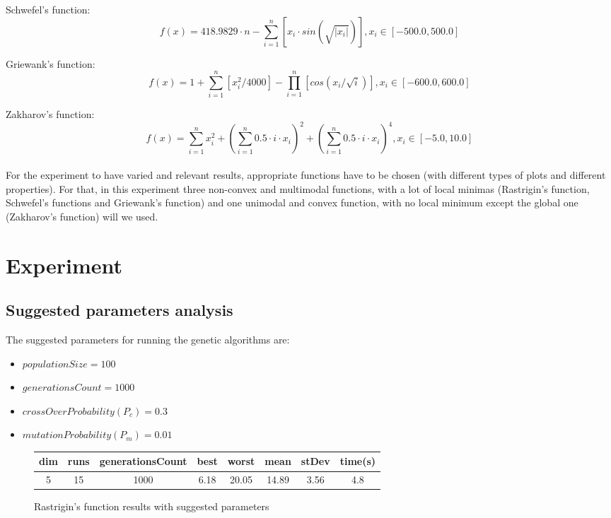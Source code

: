\documentclass[a4paper]{article}
\begin{document}
	Schwefel's function:
	$$ f(x) = 418.9829\cdot n - \sum_{i=1}^n \left[ x_i \cdot sin(\sqrt{|x_i|}) \right], x_i \in \left[ -500.0, 500.0\right]$$
	
	Griewank's function:
	$$ f(x) = 1 + \sum_{i=1}^n \left[ x_i^2/4000 \right] - \prod_{i=1}^n \left[cos(x_i/\sqrt{i})\right], x_i \in \left[-600.0, 600.0 \right]$$
	
	Zakharov's function:
	$$ f(x) = \sum_{i=1}^{n} x_i^2 + (\sum_{i=1}^n 0.5 \cdot i \cdot x_i)^2 + (\sum_{i=1}^n 0.5 \cdot i \cdot x_i)^4, x_i \in \left[ -5.0, 10.0 \right]$$
	\\
	
	
	
	For the experiment to have varied and relevant results, appropriate functions have to be chosen (with different types of plots and different properties). For that, in this experiment three non-convex and multimodal functions, with a lot of local minimas (Rastrigin's function, Schwefel's functions and Griewank's function) and one unimodal and convex function, with no local minimum except the global one (Zakharov's function) will we used.
	
	\section{Experiment}
	
	\subsection{Suggested parameters analysis}
	
	The suggested parameters for running the genetic algorithms are: 
	
	\begin{itemize}
		\item $populationSize = 100$
		\item $generationsCount = 1000$
		\item $crossOverProbability (P_{c}) = 0.3$
		\item $mutationProbability (P_{m}) = 0.01$
	\end{itemize}
	
	\begin{figure}[!h]
		\centering
		\begin{tabular}{|| c | c | c | c | c | c | c | c ||}
			\hline
			dim & runs & generationsCount & best & worst & mean & stDev & time(s) \\ \hline \hline
			5 & 15 & 1000 & 6.18 & 20.05 & 14.89 & 3.56 & 4.8 \\ \hline
		\end{tabular}
		\caption{Rastrigin's function results with suggested parameters}
	\end{figure}
	
\end{document}

